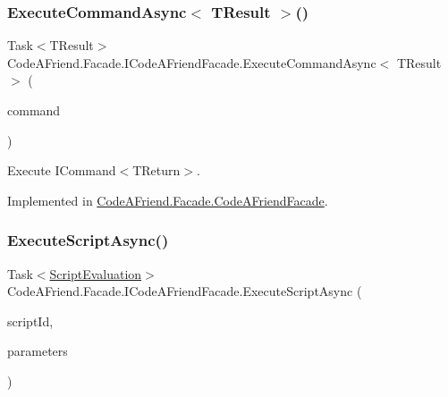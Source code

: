 \subsubsection{\texorpdfstring{Execute\+Command\+Async$<$ T\+Result $>$()}{ExecuteCommandAsync< TResult >()}}
{\footnotesize\ttfamily Task$<$T\+Result$>$ Code\+A\+Friend.\+Facade.\+I\+Code\+A\+Friend\+Facade.\+Execute\+Command\+Async$<$ T\+Result $>$ (\begin{DoxyParamCaption}\item[{\mbox{\hyperlink{interface_code_a_friend_1_1_data_model_1_1_i_command}{I\+Command}}$<$ T\+Result $>$}]{command }\end{DoxyParamCaption})}



Execute I\+Command$<$\+T\+Return$>$.



Implemented in \mbox{\hyperlink{class_code_a_friend_1_1_facade_1_1_code_a_friend_facade_a183e234ee3e7de4e25fb30121dd39891}{Code\+A\+Friend.\+Facade.\+Code\+A\+Friend\+Facade}}.

\mbox{\label{interface_code_a_friend_1_1_facade_1_1_i_code_a_friend_facade_abd81f62f5431cd404c9503ff2cfe7e9f}} 
\subsubsection{\texorpdfstring{Execute\+Script\+Async()}{ExecuteScriptAsync()}\hspace{0.1cm}{\footnotesize\ttfamily [1/2]}}
{\footnotesize\ttfamily Task$<$\mbox{\hyperlink{class_code_a_friend_1_1_data_model_1_1_script_evaluation}{Script\+Evaluation}}$>$ Code\+A\+Friend.\+Facade.\+I\+Code\+A\+Friend\+Facade.\+Execute\+Script\+Async (\begin{DoxyParamCaption}\item[{Guid}]{script\+Id,  }\item[{\mbox{\hyperlink{class_code_a_friend_1_1_data_model_1_1_execution_parameters}{Execution\+Parameters}}}]{parameters }\end{DoxyParamCaption})}



